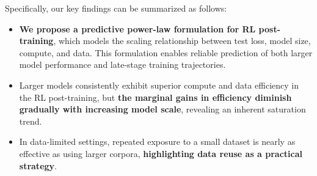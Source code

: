 Specifically, our key findings can be summarized as follows:
\vskip -0.2in
\begin{itemize}
    \item \textbf{We propose a predictive power-law formulation for RL post-training}, which models the scaling relationship between test loss, model size, compute, and data. This formulation enables reliable prediction of both larger model performance and late-stage training trajectories.
    \item Larger models consistently exhibit superior compute and data efficiency in the RL post-training, but \textbf{the marginal gains in efficiency diminish gradually with increasing model scale}, revealing an inherent saturation trend.
    \item In data-limited settings, repeated exposure to a small dataset is nearly as effective as using larger corpora, \textbf{highlighting data reuse as a practical strategy}.
\end{itemize}
